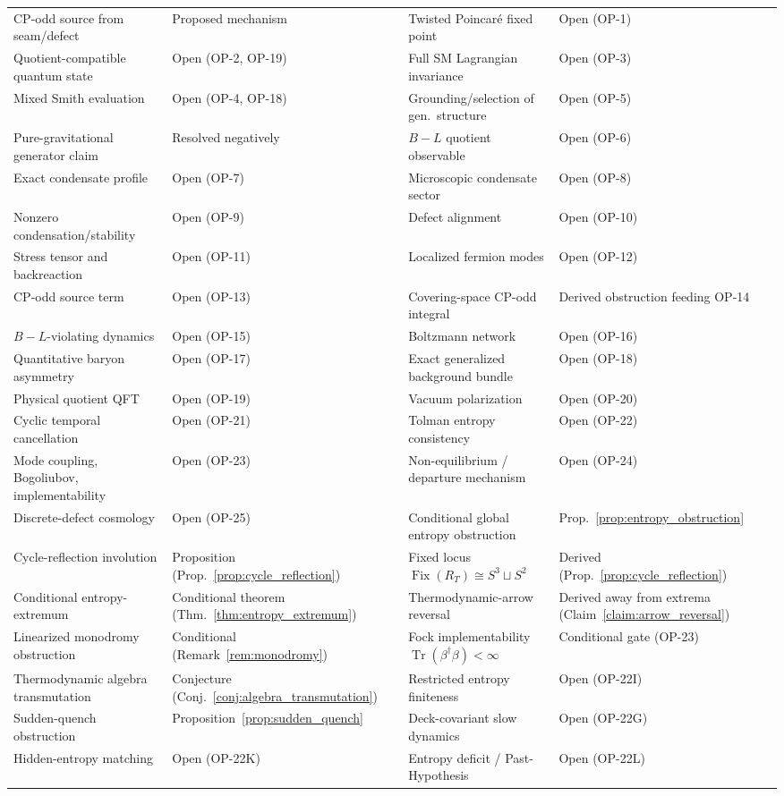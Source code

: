 \documentclass[11pt]{article}
\theoremstyle{canonmath}
\theoremstyle{canonpostulate}
\theoremstyle{canonclaim}
\begin{document}
\begin{table}[H]
\begin{tabular}{@{}p{}p{}p{}p{}@{}}
CP-odd source from seam/defect & Proposed mechanism & Twisted Poincar\'e fixed point & Open (OP-1) \\
Quotient-compatible quantum state & Open (OP-2, OP-19) & Full SM Lagrangian invariance & Open (OP-3) \\
Mixed Smith evaluation & Open (OP-4, OP-18) & Grounding/selection of gen.\ structure & Open (OP-5) \\
Pure-gravitational generator claim & Resolved negatively & $B-L$ quotient observable & Open (OP-6) \\
Exact condensate profile & Open (OP-7) & Microscopic condensate sector & Open (OP-8) \\
Nonzero condensation/stability & Open (OP-9) & Defect alignment & Open (OP-10) \\
Stress tensor and backreaction & Open (OP-11) & Localized fermion modes & Open (OP-12) \\
CP-odd source term & Open (OP-13) & Covering-space CP-odd integral & Derived obstruction feeding OP-14 \\
$B-L$-violating dynamics & Open (OP-15) & Boltzmann network & Open (OP-16) \\
Quantitative baryon asymmetry & Open (OP-17) & Exact generalized background bundle & Open (OP-18) \\
Physical quotient QFT & Open (OP-19) & Vacuum polarization & Open (OP-20) \\
Cyclic temporal cancellation & Open (OP-21) & Tolman entropy consistency & Open (OP-22) \\
Mode coupling, Bogoliubov, implementability & Open (OP-23) & Non-equilibrium / departure mechanism & Open (OP-24) \\
Discrete-defect cosmology & Open (OP-25) & Conditional global entropy obstruction & Prop.~\ref{prop:entropy_obstruction} \\
Cycle-reflection involution & Proposition (Prop.~\ref{prop:cycle_reflection}) & Fixed locus $\operatorname{Fix}(R_T) \cong S^3 \sqcup S^2$ & Derived (Prop.~\ref{prop:cycle_reflection}) \\
Conditional entropy-extremum & Conditional theorem (Thm.~\ref{thm:entropy_extremum}) & Thermodynamic-arrow reversal & Derived away from extrema (Claim~\ref{claim:arrow_reversal}) \\
Linearized monodromy obstruction & Conditional (Remark~\ref{rem:monodromy}) & Fock implementability $\operatorname{Tr}(\beta^\dagger\beta)<\infty$ & Conditional gate (OP-23) \\
Thermodynamic algebra transmutation & Conjecture (Conj.~\ref{conj:algebra_transmutation}) & Restricted entropy finiteness & Open (OP-22I) \\
Sudden-quench obstruction & Proposition~\ref{prop:sudden_quench} & Deck-covariant slow dynamics & Open (OP-22G) \\
Hidden-entropy matching & Open (OP-22K) & Entropy deficit / Past-Hypothesis & Open (OP-22L) \\
\bottomrule
\end{tabular}
\end{table}
\end{document}
